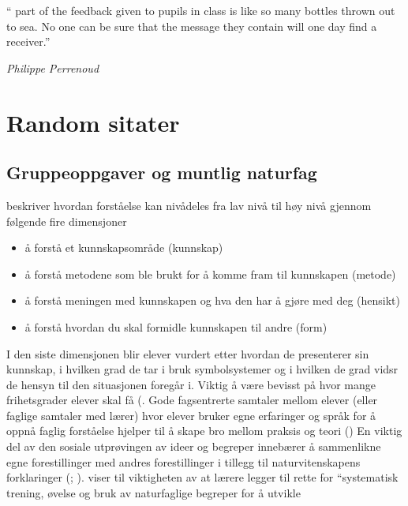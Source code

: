 \documentclass[main.tex]{subfiles}
\begin{document}
\setlength{\epigraphwidth}{0.8\textwidth}
\epigraph{``\textelp{} part of the feedback given to pupils in class is like so many 
bottles thrown out to sea. No one can be sure that the message they contain will one day 
find a receiver.''}
{\textit{Philippe Perrenoud}}


\section{Random sitater}

\subsection*{Gruppeoppgaver og muntlig naturfag}
 beskriver hvordan forståelse kan nivådeles fra lav nivå 
til høy nivå gjennom følgende fire dimensjoner
\begin{itemize} 
\item å forstå et kunnskapsområde (kunnskap)
\item å forstå metodene som ble brukt for å komme fram til kunnskapen (metode)
\item å forstå meningen med kunnskapen og hva den har å gjøre med deg (hensikt)
\item å forstå hvordan du skal formidle kunnskapen til andre (form)
\end{itemize}
I den siste dimensjonen blir elever vurdert etter hvordan de presenterer sin kunnskap,
i hvilken grad de tar i bruk symbolsystemer og i hvilken de grad vidsr de hensyn til 
den situasjonen foregår i.
\newline\newline
Viktig å være bevisst på hvor mange frihetsgrader elever skal få (.
\newline\newline
Gode fagsentrerte samtaler mellom elever (eller faglige samtaler med lærer) hvor elever bruker egne erfaringer og språk for å oppnå faglig forståelse hjelper til å skape bro mellom
praksis og teori ()
\newline\newline
En viktig del av den sosiale utprøvingen av ideer og begreper innebærer å sammenlikne egne forestillinger med andres forestillinger i tillegg til naturvitenskapens forklaringer (; ).
\newline\newline
{} viser til viktigheten av at lærere
legger til rette for ``systematisk trening, øvelse og bruk av naturfaglige begreper for å utvikle
\end{document}
